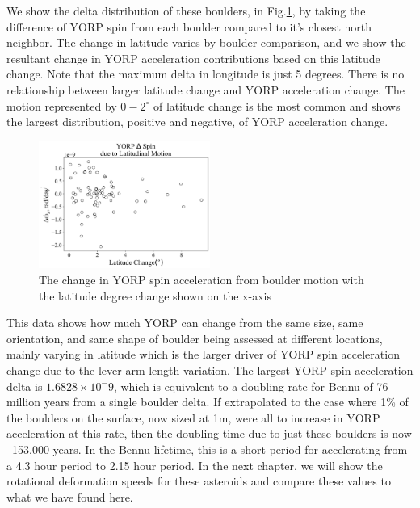 We show the delta distribution of these boulders, in Fig.\ref{fig:motion_delta}, by taking the difference of YORP spin from each boulder compared to it's closest north neighbor. The change in latitude varies by boulder comparison, and we show the resultant change in YORP acceleration contributions based on this latitude change. Note that the maximum delta in longitude is just 5 degrees. There is no relationship between larger latitude change and YORP acceleration change. The motion represented by $0-2^{\circ}$ of latitude change is the most common and shows the largest distribution, positive and negative, of YORP acceleration change. 

\begin{figure}[H]
    \centering
    \includegraphics[width=0.5\textwidth]{fig/yorp_delta_boulder_motion_bennu.png}
    \caption{The change in YORP spin acceleration from boulder motion with the latitude degree change shown on the x-axis}
    \label{fig:motion_delta}
\end{figure}

This data shows how much YORP can change from the same size, same orientation, and same shape of boulder being assessed at different locations, mainly varying in latitude which is the larger driver of YORP spin acceleration change due to the lever arm length variation. The largest YORP spin acceleration delta is $1.6828\times 10^-9$, which is equivalent to a doubling rate for Bennu of 76 million years from a single boulder delta. If extrapolated to the case where 1\% of the boulders on the surface, now sized at 1m, were all to increase in YORP acceleration at this rate, then the doubling time due to just these boulders is now ~153,000 years. In the Bennu lifetime, this is a short period for accelerating from a 4.3 hour period to 2.15 hour period. In the next chapter, we will show the rotational deformation speeds for these asteroids and compare these values to what we have found here.





